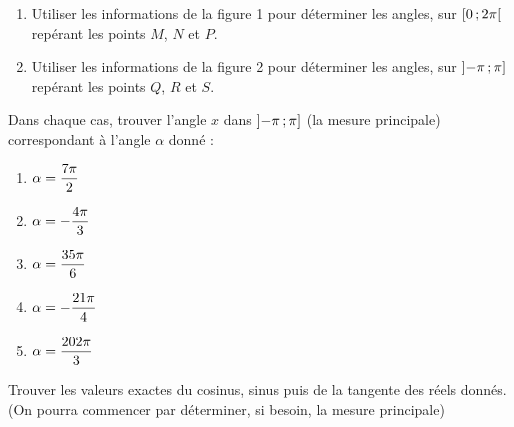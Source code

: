 \documentclass[a4paper,11pt]{article}
\begin{document}
\begin{enumerate}
	\item Utiliser les informations de la {\sf figure 1} pour déterminer les angles, sur $\mbox{\ensuremath{\left[0\mathpunct{};2\pi\right[}}$ repérant les points $M$, $N$ et $P$.
	\item Utiliser les informations de la {\sf figure 2} pour déterminer les angles, sur $\mbox{\ensuremath{\left]-\pi\mathpunct{};\pi\right]}}$ repérant les points $Q$, $R$ et $S$.
\end{enumerate}

\medskip


\medskip

Dans chaque cas, trouver l'angle $x$ dans $\mbox{\ensuremath{\left]-\pi\mathpunct{};\pi\right]}}$ (la mesure principale) correspondant à l'angle $\alpha$ donné :

\bigskip

\begin{minipage}{\linewidth}
	\begin{multicols}{5}
		\begin{enumerate}
			\item $\alpha = \dfrac{7\pi}{2}$
			\item $\alpha = -\dfrac{4\pi}{3}$
			\item $\alpha = \dfrac{35\pi}{6}$
			\item $\alpha = -\dfrac{21\pi}{4}$
			\item $\alpha = \dfrac{202\pi}{3}$
		\end{enumerate}
	\end{multicols}
\end{minipage}

\newpage


\medskip

Trouver les valeurs exactes du cosinus, sinus puis de la tangente des réels donnés. (On pourra commencer par déterminer, si besoin, la mesure principale)
\end{document}
